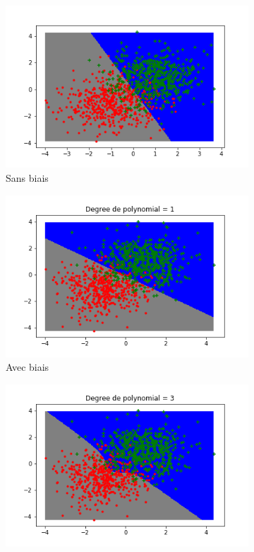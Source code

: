 \documentclass[a4paper,12pt]{article}
\begin{document}
\begin{figure}[h!]
\caption{Perceptron avec les données artifiel en 2 dimension}
\label{fig:tme4_perceptron}
\begin{subfigure}{.33\textwidth}
	\centering
	\includegraphics[width=\linewidth]{images/tme4/perceptron_no_biais.png}
	\caption{Sans biais}
\end{subfigure}%
\begin{subfigure}{.33\textwidth}
  \centering
	\includegraphics[width=\linewidth]{images/tme4/perceptron_biais1.png}
	\caption{Avec biais}
\end{subfigure}
\begin{subfigure}{.33\textwidth}
  \centering
	\includegraphics[width=\linewidth]{images/tme4/perceptron_biais3.png}

\end{subfigure}
\end{figure}
\end{document}
